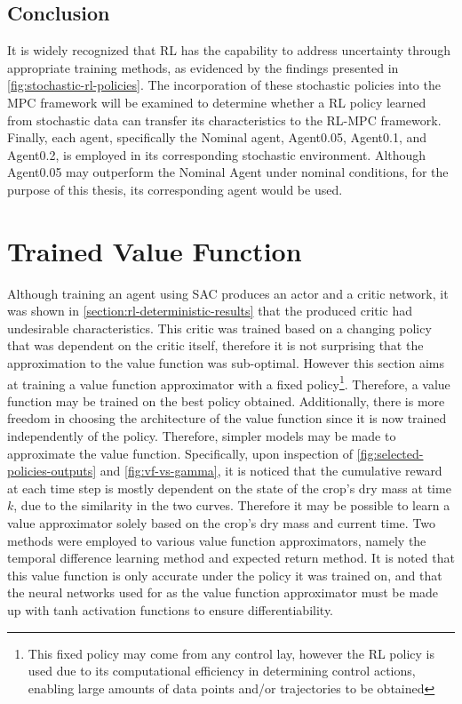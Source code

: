 \subsection{Conclusion}
It is widely recognized that RL has the capability to address uncertainty through appropriate training methods, as evidenced by the findings presented in \autoref{fig:stochastic-rl-policies}. The incorporation of these stochastic policies into the MPC framework will be examined to determine whether a RL policy learned from stochastic data can transfer its characteristics to the RL-MPC framework. Finally, each agent, specifically the Nominal agent, Agent0.05, Agent0.1, and Agent0.2, is employed in its corresponding stochastic environment. Although Agent0.05 may outperform the Nominal Agent under nominal conditions, for the purpose of this thesis, its corresponding agent would be used.

\section{Trained Value Function}
\label{section:trained-vf}

Although training an agent using SAC produces an actor and a critic network, it was shown in \autoref{section:rl-deterministic-results} that the produced critic had undesirable characteristics.
This critic was trained based on a changing policy that was dependent on the critic itself, therefore it is not surprising that the approximation to the value function was sub-optimal. However this section aims at training a value function approximator with a fixed policy\footnote{This fixed policy may come from any control lay, however the RL policy is used due to its computational efficiency in determining control actions, enabling large amounts of data points and/or trajectories to be obtained}. Therefore, a value function may be trained on the best policy obtained. Additionally, there is more freedom in choosing the architecture of the value function since it is now trained independently of the policy. Therefore, simpler models may be made to approximate the value function. Specifically, upon inspection of \autoref{fig:selected-policies-outputs} and \autoref{fig:vf-vs-gamma}, it is noticed that the cumulative reward at each time step is mostly dependent on the state of the crop's dry mass at time $k$, due to the similarity in the two curves. Therefore it may be possible to learn a value approximator solely based on the crop's dry mass and current time. Two methods were employed to various value function approximators, namely the temporal difference learning method and expected return method. It is noted that this value function is only accurate under the policy it was trained on, and that the neural networks used for as the value function approximator must be made up with tanh activation functions to ensure differentiability. 



